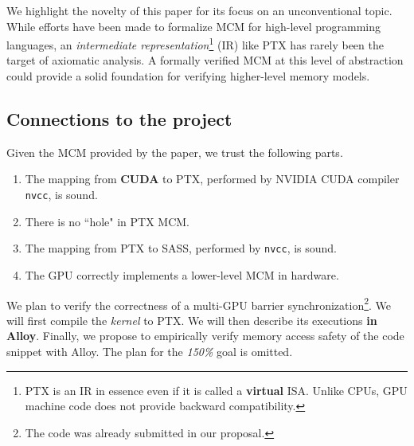\documentclass[11pt,a4paper]{article}
\begin{document}
We highlight the novelty of this paper for its focus on an unconventional topic. While efforts have been made to formalize MCM for high-level programming languages, an \textit{intermediate representation}\footnote{PTX is an IR in essence even if it is called a \textbf{virtual} ISA. Unlike CPUs, GPU machine code does not provide backward compatibility.} (IR) like PTX has rarely been the target of axiomatic analysis. A formally verified MCM at this level of abstraction could provide a solid foundation for verifying higher-level memory models.


\subsection{Connections to the project}

Given the MCM provided by the paper, we trust the following parts.

\begin{enumerate}
    \item The mapping from \textbf{CUDA} to PTX, performed by NVIDIA CUDA compiler \verb|nvcc|, is sound.
    \item There is no ``hole" in PTX MCM.
    \item The mapping from PTX to SASS, performed by \verb|nvcc|, is sound.
    \item The GPU correctly implements a lower-level MCM in hardware.
\end{enumerate}

We plan to verify the correctness of a multi-GPU barrier synchronization\footnote{The code was already submitted in our proposal.}. We will first compile the \textit{kernel} to PTX. We will then describe its executions \textbf{in Alloy}. Finally, we propose to empirically verify memory access safety of the code snippet with Alloy. The plan for the \textit{150\%} goal is omitted.



\end{document}
